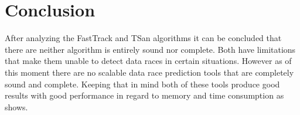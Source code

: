 \documentclass[12pt]{article}
\begin{document}
	\section{Conclusion}
	After analyzing the FastTrack and TSan algorithms it can be concluded that there are neither algorithm is entirely sound nor complete. Both have limitations that make them unable to detect data races in certain situations. However as of this moment there are no scalable data race prediction tools that are completely sound and complete. Keeping that in mind both of these tools produce good results with good performance in regard to memory and time consumption as \cite{flanagan} shows.
	\newpage                                          
	\printbibliography[heading= bibintoc, title={List of Literature}]
	\newpage
	{\hypersetup{linkcolor=black}
		\listoffigures
		\newpage
		\listoftables
		\newpage
		\lstlistoflistings
	}
\end{document}
